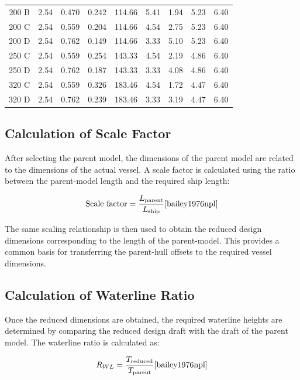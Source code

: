 \documentclass[12pt,a4paper,twoside]{report}
\begin{document}
\begin{table}[H]
{\begin{tabular}{c c c c c c c c c}
200 B & 2.54 & 0.470 & 0.242 & 114.66 & 5.41 & 1.94  & 5.23 & 6.40 \\
200 C & 2.54 & 0.559 & 0.204 & 114.66 & 4.54 & 2.75  & 5.23 & 6.40 \\
200 D & 2.54 & 0.762 & 0.149 & 114.66 & 3.33 & 5.10  & 5.23 & 6.40 \\

250 C & 2.54 & 0.559 & 0.254 & 143.33 & 4.54 & 2.19  & 4.86 & 6.40 \\
250 D & 2.54 & 0.762 & 0.187 & 143.33 & 3.33 & 4.08  & 4.86 & 6.40 \\

320 C & 2.54 & 0.559 & 0.326 & 183.46 & 4.54 & 1.72  & 4.47 & 6.40 \\
320 D & 2.54 & 0.762 & 0.239 & 183.46 & 3.33 & 3.19  & 4.47 & 6.40 \\

\bottomrule
\end{tabular}%
}
\end{table}

\subsection{Calculation of Scale Factor}
After selecting the parent model, the dimensions of the parent model are related to the dimensions of the actual vessel. A scale factor is calculated using the ratio between the parent-model length and the required ship length:

\begin{equation}
\text{Scale factor}= \frac{L_{\text{parent}}}{L_{\text{ship}}}\cite{bailey1976npl}
\end{equation}

\vspace{\baselineskip}\par\noindent The same scaling relationship is then used to obtain the reduced design dimensions corresponding to the length of the parent-model. This provides a common basis for transferring the parent-hull offsets to the required vessel dimensions.
\subsection{Calculation of Waterline Ratio}
Once the reduced dimensions are obtained, the required waterline heights are determined by comparing the reduced design draft with the draft of the parent model. The waterline ratio is calculated as:

\begin{equation}
R_{WL}= \frac{T_{\text{reduced}}}{T_{\text{parent}}}\cite{bailey1976npl}
\end{equation} 
\end{document}
